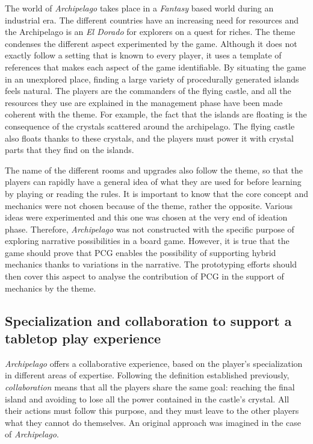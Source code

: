 The world of \textit{Archipelago} takes place in a \textit{Fantasy} based world during an industrial era. The different countries have an increasing need for resources and the Archipelago is an \textit{El Dorado} for explorers on a quest for riches. The theme condenses the different aspect experimented by the game. Although it does not exactly follow a setting that is known to every player, it uses a template of references that makes each aspect of the game identifiable. By situating the game in an unexplored place, finding a large variety of procedurally generated islands feels natural. The players are the commanders of the flying castle, and all the resources they use are explained in the management phase have been made coherent with the theme. For example, the fact that the islands are floating is the consequence of the crystals scattered around the archipelago. The flying castle also floats thanks to these crystals, and the players must power it with crystal parts that they find on the islands. 

The name of the different rooms and upgrades also follow the theme, so that the players can rapidly have a general idea of what they are used for before learning by playing or reading the rules. It is important to know that the core concept and mechanics were not chosen because of the theme, rather the opposite. Various ideas were experimented and this one was chosen at the very end of ideation phase. Therefore, \textit{Archipelago} was not constructed with the specific purpose of exploring narrative possibilities in a board game. However, it is true that the game should prove that PCG enables the possibility of supporting hybrid mechanics thanks to variations in the narrative. The prototyping efforts should then cover this aspect to analyse the contribution of PCG in the support of mechanics by the theme.
\subsection{Specialization and collaboration to support a tabletop play experience}
\textit{Archipelago} offers a collaborative experience, based on the player's specialization in different areas of expertise. Following the definition established previously, \textit{collaboration} means that all the players share the same goal: reaching the final island and avoiding to lose all the power contained in the castle's crystal. All their actions must follow this purpose, and they must leave to the other players what they cannot do themselves. An original approach was imagined in the case of \textit{Archipelago}.
